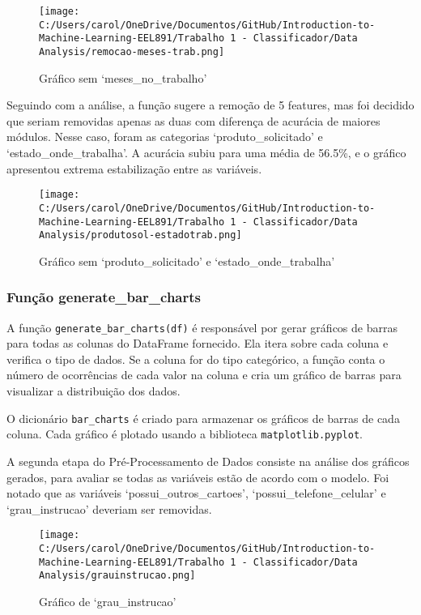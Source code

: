 \documentclass[11pt]{article}
\begin{document}
\begin{figure}
\centering
\texttt{[image: C:/Users/carol/OneDrive/Documentos/GitHub/Introduction-to-Machine-Learning-EEL891/Trabalho 1 - Classificador/Data Analysis/remocao-meses-trab.png]}
\caption{Gráfico sem `meses\_no\_trabalho'}
\end{figure}

Seguindo com a análise, a função sugere a remoção de 5 features, mas foi
decidido que seriam removidas apenas as duas com diferença de acurácia
de maiores módulos. Nesse caso, foram as categorias
`produto\_solicitado' e `estado\_onde\_trabalha'. A acurácia subiu para
uma média de 56.5\%, e o gráfico apresentou extrema estabilização entre
as variáveis.

\begin{figure}
\centering
\texttt{[image: C:/Users/carol/OneDrive/Documentos/GitHub/Introduction-to-Machine-Learning-EEL891/Trabalho 1 - Classificador/Data Analysis/produtosol-estadotrab.png]}
\caption{Gráfico sem `produto\_solicitado' e `estado\_onde\_trabalha'}
\end{figure}

\hypertarget{funuxe7uxe3o-generate_bar_charts}{%
\subsubsection{Função
generate\_bar\_charts}\label{funuxe7uxe3o-generate_bar_charts}}

A função \texttt{generate\_bar\_charts(df)} é responsável por gerar
gráficos de barras para todas as colunas do DataFrame fornecido. Ela
itera sobre cada coluna e verifica o tipo de dados. Se a coluna for do
tipo categórico, a função conta o número de ocorrências de cada valor na
coluna e cria um gráfico de barras para visualizar a distribuição dos
dados.

O dicionário \texttt{bar\_charts} é criado para armazenar os gráficos de
barras de cada coluna. Cada gráfico é plotado usando a biblioteca
\texttt{matplotlib.pyplot}.

A segunda etapa do Pré-Processamento de Dados consiste na análise dos
gráficos gerados, para avaliar se todas as variáveis estão de acordo com
o modelo. Foi notado que as variáveis `possui\_outros\_cartoes',
`possui\_telefone\_celular' e `grau\_instrucao' deveriam ser removidas.

\begin{figure}
\centering
\texttt{[image: C:/Users/carol/OneDrive/Documentos/GitHub/Introduction-to-Machine-Learning-EEL891/Trabalho 1 - Classificador/Data Analysis/grauinstrucao.png]}
\caption{Gráfico de `grau\_instrucao'}
\end{figure}
\end{document}

